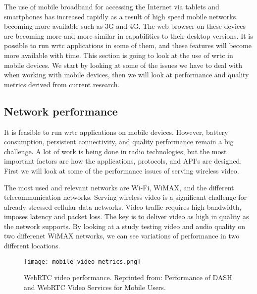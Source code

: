 
The use of mobile broadband for accessing the Internet via tablets and smartphones has increased rapidly as a result of high speed mobile networks becoming more available such as 3G and 4G. The web browser on these devices are becoming more and more similar in capabilities to their desktop versions. It is possible to run \gls{wrtc} applications in some of them, and these features will become more available with time. This section is going to look at the use of \gls{wrtc} in mobile devices. We start by looking at some of the issues we have to deal with when working with mobile devices, then we will look at performance and quality metrics derived from current research.

\subsection{Network performance}
It is feasible to run \gls{wrtc} applications on mobile devices. However, battery consumption, persistent connectivity, and quality performance remain a big challenge. A lot of work is being done in radio technologies, but the most important factors are how the applications, protocols, and API's are designed\cite{isomaki2012considerations}. First we will look at some of the performance issues of serving wireless video.

The most used and relevant networks are Wi-Fi, WiMAX, and the different telecommunication networks. Serving wireless video is a significant challenge for already-stressed cellular data networks\cite{erman2011over}. Video traffic requires high bandwidth, imposes latency and packet loss. The key is to deliver video as high in quality as the network supports. By looking at a study testing video and audio quality on two differenet WiMAX networks\cite{fund2013performance}, we can see variations of performance in two different locations.

\pagebreak
\begin{figure}[here]
\centerline{\texttt{[image: mobile-video-metrics.png]}}
\caption{WebRTC video performance. Reprinted from: Performance of DASH and WebRTC Video Services for Mobile Users\cite{fund2013performance}.}
\label{fig:mobile-video-metrics}
\end{figure}


